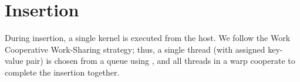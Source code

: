 \section{Insertion}

During insertion, a single kernel is executed from the host. We follow the Work Cooperative Work-Sharing strategy; thus, a single thread (with assigned key-value pair) is chosen from a queue using , and all threads in a warp cooperate to complete the insertion together.
